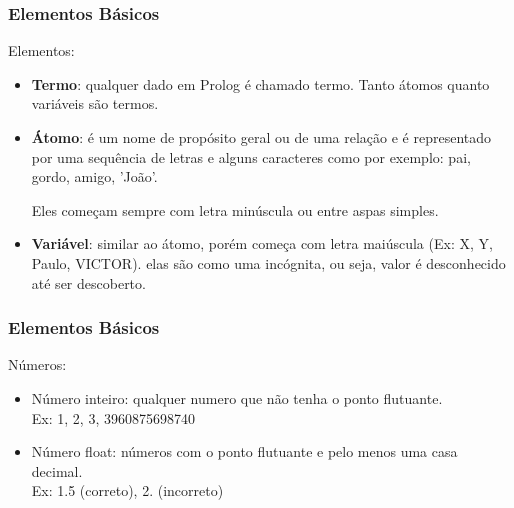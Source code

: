 \documentclass[sans]{beamer}
\begin{document}
\begin{frame}[fragile]   %
\frametitle{Elementos Básicos}
\begin{block}{Elementos:}
\begin{itemize}
\itemsep 20pt
\item \textbf{Termo}: qualquer dado em Prolog é chamado termo. Tanto átomos quanto variáveis são termos.

\item \textbf{Átomo}: é um nome de propósito geral ou de uma relação e é
representado por uma sequência de letras e alguns caracteres como por exemplo: pai, gordo, amigo, 'João'. 

Eles começam sempre com letra minúscula ou entre aspas simples.
\item \textbf{Variável}: similar ao átomo, porém começa com letra maiúscula (Ex: X, Y, Paulo, VICTOR). elas são como uma incógnita, 
ou seja, valor é desconhecido até ser descoberto.

\end{itemize}
\end{block}  
\end{frame}

\begin{frame}[fragile]   %
\frametitle{Elementos Básicos}
\begin{block}{Números:}
\begin{itemize}
\itemsep 20pt

\item Número inteiro: qualquer numero que não tenha o ponto flutuante.\\
Ex: 1, 2, 3, 3960875698740

\item Número float: números com o ponto flutuante e pelo menos uma casa decimal.\\
Ex: 1.5 (correto), 2. (incorreto)

\end{itemize}
\end{block}   
\end{frame}
\end{document}

